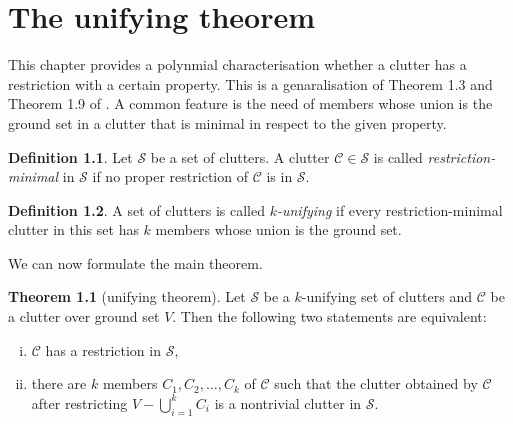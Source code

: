\documentclass[a4paper, 12pt, twoside=false]{scrbook}
\theoremstyle{definition}
\newtheorem*{definition}{Definition}
\newtheorem{theorem}{Theorem}[chapter]
\begin{document}
\chapter{The unifying theorem}
This chapter provides a polynmial characterisation whether a clutter has a restriction with a certain property.
This is a genaralisation of Theorem 1.3 and Theorem 1.9 of \cite{restrictions}.
A common feature is the need of members whose union is the ground set in a clutter that is minimal in respect to the given property.
   \begin{definition}
       Let $\mathcal{S}$ be a set of clutters.
       A clutter $\mathcal{C} \in \mathcal{S}$ is called \emph{restriction-minimal} in $\mathcal{S}$ if no proper restriction of $\mathcal{C}$ is in $\mathcal{S}$.
   \end{definition}

   \begin{definition}
       A set of clutters is called \emph{$k$-unifying} if every restriction-minimal clutter in this set has $k$ members whose union is the ground set.
   \end{definition}

   We can now formulate the main theorem.

   \begin{theorem}[unifying theorem]\label{unifying}
       Let $\mathcal{S}$ be a $k$-unifying set of clutters and $\mathcal{C}$ be a clutter over ground set $V$.
       Then the following two statements are equivalent:
       \leavevmode
       \begin{enumerate}[(i)]
           \item $\mathcal{C}$ has a restriction in $\mathcal{S}$,
           \item there are $k$ members $C_1, C_2, \ldots, C_k$ of $\mathcal{C}$ such that the clutter obtained by $\mathcal{C}$ after restricting $V - \bigcup_{i=1}^k C_i$ is a nontrivial clutter in $\mathcal{S}$.
       \end{enumerate}
   \end{theorem}
\end{document}
